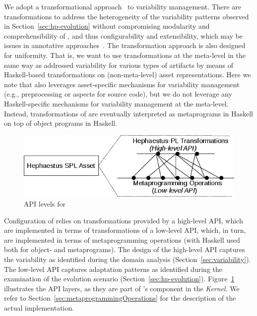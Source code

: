 We adopt a transformational approach~\cite{deltaSchaefer} to variability management. There are transformations to address the heterogeneity of the variability patterns observed in Section~\ref{sec:hp-evolution} without compromising modularity and comprehensibility of \hpl, and thus configurability and extensibility, which may be issues in annotative approaches~\cite{kastner:2008}. The transformation approach is also designed for uniformity. That is, we want \hpl{} to use transformations at the meta-level in the same way as \hp{} addressed variability for various types of artifacts by means of Haskell-based transformations on (non-meta-level) asset representations. Here we note that \hp{} also leverages asset-specific mechanisms for variability management (e.g., preprocessing or aspects for source code), but we do not leverage any Haskell-specific mechanisms for variability management at the meta-level. Instead, transformations of \hpl{} are eventually interpreted as metaprograms in Haskell on top of object programs in Haskell.


\begin{figure}[t!]
\includegraphics[scale=0.7]{imagens/apis-hpl-asset.png}
\caption{API levels for \hpsplasset}
\label{fig:hpl-apis}
\end{figure}


Configuration of \hpl{} relies on transformations provided by a high-level API, which are implemented in terms of 
transformations of a low-level API, which, in turn, are implemented in terms of metaprogramming operations (with Haskell used both for object- and metaprograms).  The design of the high-level API captures the variability as identified during the domain analysis (Section~\ref{sec:variability}). The low-level API captures adaptation patterns as identified during the examination of the evolution scenario (Section~\ref{sec:hp-evolution}). Figure~\ref{fig:hpl-apis} illustrates the API layers, as they are part of \hpl's component \hpsplasset{} in the \emph{Kernel}. We refer to  Section~\ref{sec:metaprogrammingOperations} for the description of the actual implementation.

